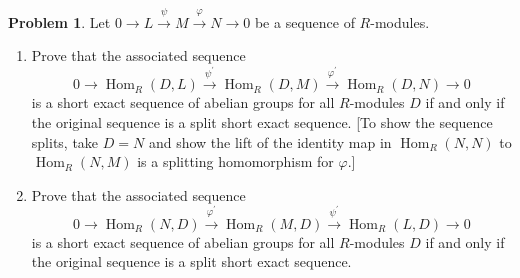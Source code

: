 \documentclass{amsart}
\numberwithin{equation}{section}
\theoremstyle{definition}
\newtheorem{problem}[thm]{Problem}
\begin{document}
\begin{problem}
 Let \(0 \longrightarrow L \xrightarrow{\psi} M \xrightarrow{\varphi} N \longrightarrow 0\) be a sequence of \(R\)-modules.
\begin{enumerate}
 \item Prove that the associated sequence
\[
0 \longrightarrow \operatorname{Hom}_R(D, L) \xrightarrow{\psi^{\prime}} \operatorname{Hom}_R(D, M) \xrightarrow{\varphi^{\prime}} \operatorname{Hom}_R(D, N) \longrightarrow 0
\]
is a short exact sequence of abelian groups for all \(R\)-modules \(D\) if and only if the original sequence is a split short exact sequence. [To show the sequence splits, take \(D=N\) and show the lift of the identity map in \(\operatorname{Hom}_R(N, N)\) to \(\operatorname{Hom}_R(N, {M})\) is a splitting homomorphism for \(\varphi\).]
\item Prove that the associated sequence
\[
0 \longrightarrow \operatorname{Hom}_R(N, D) \xrightarrow{\varphi^{\prime}} \operatorname{Hom}_R(M, D) \xrightarrow{\psi^{\prime}} \operatorname{Hom}_R(L, D) \longrightarrow 0
\]
is a short exact sequence of abelian groups for all \(R\)-modules \(D\) if and only if the original sequence is a split short exact sequence.
\end{enumerate}

\end{problem}
\end{document}

